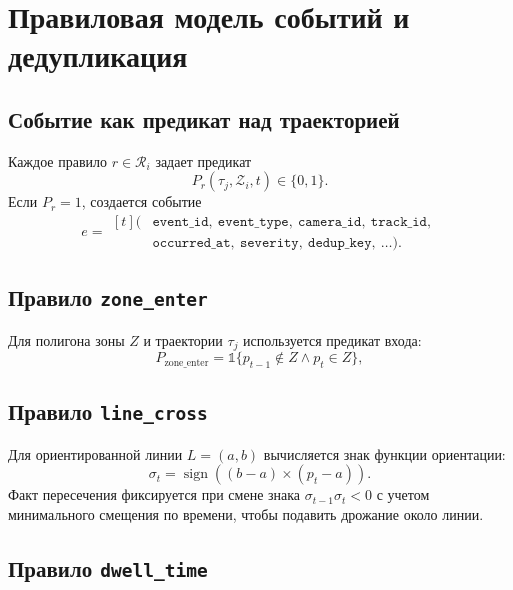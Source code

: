 \section{Правиловая модель событий и дедупликация}

\subsection{Событие как предикат над траекторией}

Каждое правило \(r \in \mathcal{R}_i\) задает предикат
\begin{equation}
P_r(\tau_j, \mathcal{Z}_i, t) \in \{0,1\}.
\end{equation}
Если \(P_r = 1\), создается событие
\begin{equation}
e =
\begin{aligned}[t]
(&\texttt{event\_id},\ \texttt{event\_type},\ \texttt{camera\_id},\ \texttt{track\_id},\\
 &\texttt{occurred\_at},\ \texttt{severity},\ \texttt{dedup\_key},\ \dots).
\end{aligned}
\end{equation}
\subsection{Правило \texttt{zone\_enter}}

Для полигона зоны \(Z\) и траектории \(\tau_j\) используется предикат входа:
\begin{equation}
P_{\text{zone\_enter}} = \mathbb{1}\{p_{t-1}\notin Z \land p_t \in Z\},
\end{equation}
\where
{}

\subsection{Правило \texttt{line\_cross}}

Для ориентированной линии \(L = (a,b)\) вычисляется знак функции ориентации:
\begin{equation}
\sigma_t = \operatorname{sign}\left((b-a)\times(p_t-a)\right).
\end{equation}
Факт пересечения фиксируется при смене знака \(\sigma_{t-1}\sigma_t < 0\) с учетом минимального смещения по времени, чтобы подавить дрожание около линии.

\subsection{Правило \texttt{dwell\_time}}

